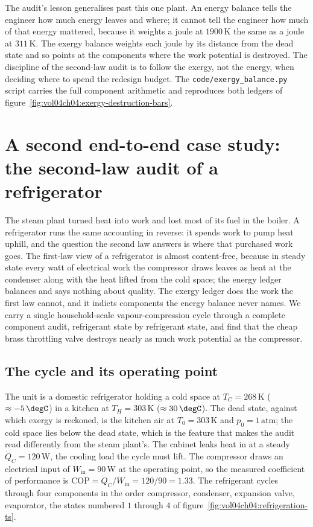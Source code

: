 The audit's lesson generalises past this one plant. An energy balance
tells the engineer how much energy leaves and where; it cannot tell the
engineer how much of that energy mattered, because it weights a joule at
$1900\,\si{\kelvin}$ the same as a joule at $311\,\si{\kelvin}$. The
exergy balance weights each joule by its distance from the dead state and
so points at the components where the work potential is destroyed. The
discipline of the second-law audit is to follow the exergy, not the
energy, when deciding where to spend the redesign budget. The
\texttt{code/exergy\_balance.py} script carries the full component
arithmetic and reproduces both ledgers of
figure~\ref{fig:vol04ch04:exergy-destruction-bars}.



\section{A second end-to-end case study: the second-law audit of a refrigerator}

The steam plant turned heat into work and lost most of its fuel in the
boiler. A refrigerator runs the same accounting in reverse: it spends
work to pump heat uphill, and the question the second law answers is
where that purchased work goes. The first-law view of a refrigerator is
almost content-free, because in steady state every watt of electrical
work the compressor draws leaves as heat at the condenser along with the
heat lifted from the cold space; the energy ledger balances and says
nothing about quality. The exergy ledger does the work the first law
cannot, and it indicts components the energy balance never names. We
carry a single household-scale vapour-compression cycle through a
complete component audit, refrigerant state by refrigerant state, and
find that the cheap brass throttling valve destroys nearly as much work
potential as the compressor.

\subsection{The cycle and its operating point}

The unit is a domestic refrigerator holding a cold space at $T_C =
268\,\si{\kelvin}$ ($\approx -5\,\degC$) in a kitchen at $T_H =
303\,\si{\kelvin}$ ($\approx 30\,\degC$). The dead state, against which
exergy is reckoned, is the kitchen air at $T_0 = 303\,\si{\kelvin}$ and
$p_0 = 1\,\text{atm}$; the cold space lies below the dead state, which is
the feature that makes the audit read differently from the steam plant's.
The cabinet leaks heat in at a steady $\dot Q_C = 120\,\text{W}$, the
cooling load the cycle must lift. The compressor draws an electrical
input of $\dot W_{\text{in}} = 90\,\text{W}$ at the operating point, so
the measured coefficient of performance is $\mathrm{COP} = \dot Q_C/\dot
W_{\text{in}} = 120/90 = 1.33$. The refrigerant cycles through four
components in the order compressor, condenser, expansion valve,
evaporator, the states numbered $1$ through $4$ of
figure~\ref{fig:vol04ch04:refrigeration-ts}.

